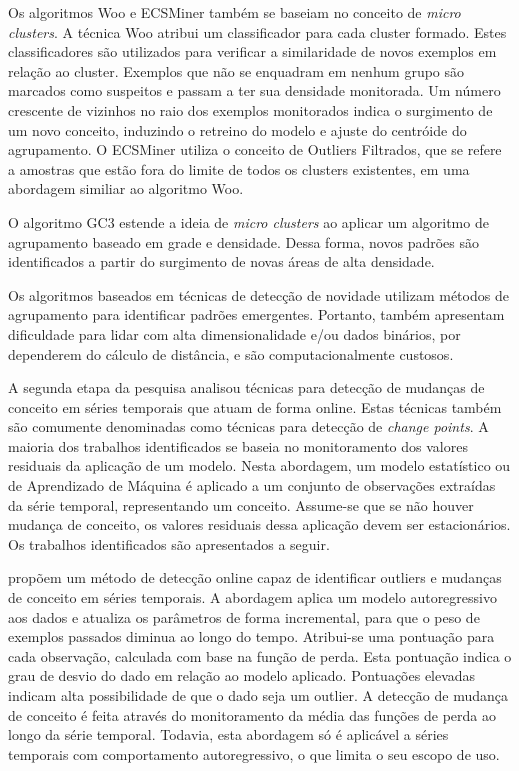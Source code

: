 \documentclass[msc, classic, a4paper]{ufbathesis}
\begin{document}
Os algoritmos Woo \cite{Lee:Wang:Ryu:2007} e ECSMiner \cite{Masud:2011:CNC:1978259.1978529} também se baseiam no conceito de \textit{micro clusters}. A técnica Woo atribui um classificador para cada cluster formado. Estes classificadores são utilizados para verificar a similaridade de novos exemplos em relação ao cluster. Exemplos que não se enquadram em nenhum grupo são marcados como suspeitos e passam a ter sua densidade monitorada. Um número crescente de vizinhos no raio dos exemplos monitorados indica o surgimento de um novo conceito, induzindo o retreino do modelo e ajuste do centróide do agrupamento.
O ECSMiner \cite{Masud:2011:CNC:1978259.1978529} utiliza o conceito de Outliers Filtrados, que se refere a amostras que estão fora do limite de todos os clusters existentes, em uma abordagem similiar ao algoritmo Woo.

O algoritmo GC3 \cite{Sethi2016b:GC3} estende a ideia de \textit{micro clusters} ao aplicar um algoritmo de agrupamento baseado em grade e densidade. Dessa forma, novos padrões são identificados a partir do surgimento de novas áreas de alta densidade.

Os algoritmos baseados em técnicas de detecção de novidade utilizam métodos de agrupamento para identificar padrões emergentes. Portanto, também apresentam dificuldade para lidar com alta dimensionalidade e/ou dados binários, por dependerem do cálculo de distância, e são computacionalmente custosos.

A segunda etapa da pesquisa analisou técnicas para detecção de mudanças de conceito em séries temporais que atuam de forma online. Estas técnicas também são comumente denominadas como técnicas para detecção de \textit{change points}. A maioria dos trabalhos identificados se baseia no monitoramento dos valores residuais da aplicação de um modelo. Nesta abordagem, um modelo estatístico ou de Aprendizado de Máquina é aplicado a um conjunto de observações extraídas da série temporal, representando um conceito.
Assume-se que se não houver mudança de conceito, os valores residuais dessa aplicação devem ser estacionários. Os trabalhos identificados são apresentados a seguir.

 propõem um método de detecção online capaz de identificar outliers e mudanças de conceito em séries temporais.
A abordagem aplica um modelo autoregressivo aos dados e atualiza os parâmetros de forma incremental, para que o peso de exemplos passados diminua ao longo do tempo. Atribui-se uma pontuação para cada observação, calculada com base na função de perda. Esta pontuação indica o grau de desvio do dado em relação ao modelo aplicado. Pontuações elevadas indicam alta possibilidade de que o dado seja um outlier. A detecção de mudança de conceito é feita através do monitoramento da média das funções de perda ao longo da série temporal. Todavia, esta abordagem só é aplicável a séries temporais com comportamento autoregressivo, o que limita o seu escopo de uso.
\end{document}
